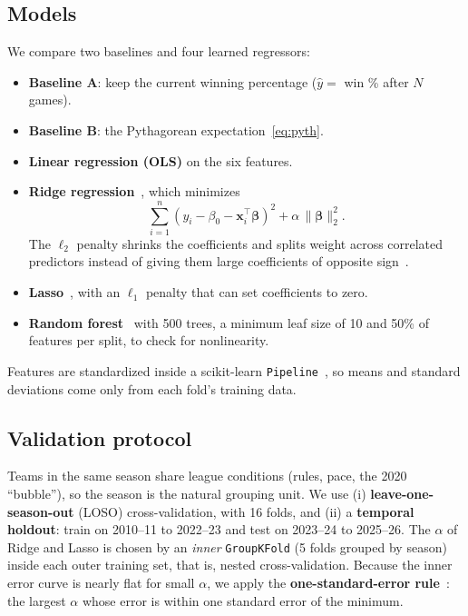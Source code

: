 \documentclass[conference]{IEEEtran}
\begin{document}
\subsection{Models}
We compare two baselines and four learned regressors:
\begin{itemize}
\item \textbf{Baseline A}: keep the current winning percentage ($\hat y = $ win \% after $N$ games).
\item \textbf{Baseline B}: the Pythagorean expectation~\eqref{eq:pyth}.
\item \textbf{Linear regression (OLS)} on the six features.
\item \textbf{Ridge regression}~\cite{hoerl1970}, which minimizes
\begin{equation}
\sum_{i=1}^{n}\left(y_i-\beta_0-\mathbf{x}_i^{\top}\boldsymbol{\beta}\right)^2+\alpha\,\|\boldsymbol{\beta}\|_2^2 .
\label{eq:ridge}
\end{equation}
The $\ell_2$ penalty shrinks the coefficients and splits weight across correlated predictors instead of giving them large coefficients of opposite sign~\cite{islr2021,esl2009}.
\item \textbf{Lasso}~\cite{tibshirani1996}, with an $\ell_1$ penalty that can set coefficients to zero.
\item \textbf{Random forest}~\cite{breiman2001} with 500 trees, a minimum leaf size of 10 and 50\% of features per split, to check for nonlinearity.
\end{itemize}
Features are standardized inside a scikit-learn \texttt{Pipeline}~\cite{sklearn}, so means and standard deviations come only from each fold's training data.

\subsection{Validation protocol}
Teams in the same season share league conditions (rules, pace, the 2020 ``bubble''), so the season is the natural grouping unit. We use (i) \textbf{leave-one-season-out} (LOSO) cross-validation, with 16 folds, and (ii) a \textbf{temporal holdout}: train on 2010--11 to 2022--23 and test on 2023--24 to 2025--26. The $\alpha$ of Ridge and Lasso is chosen by an \emph{inner} \texttt{GroupKFold} (5 folds grouped by season) inside each outer training set, that is, nested cross-validation. Because the inner error curve is nearly flat for small $\alpha$, we apply the \textbf{one-standard-error rule}~\cite{esl2009}: the largest $\alpha$ whose error is within one standard error of the minimum.
\end{document}
